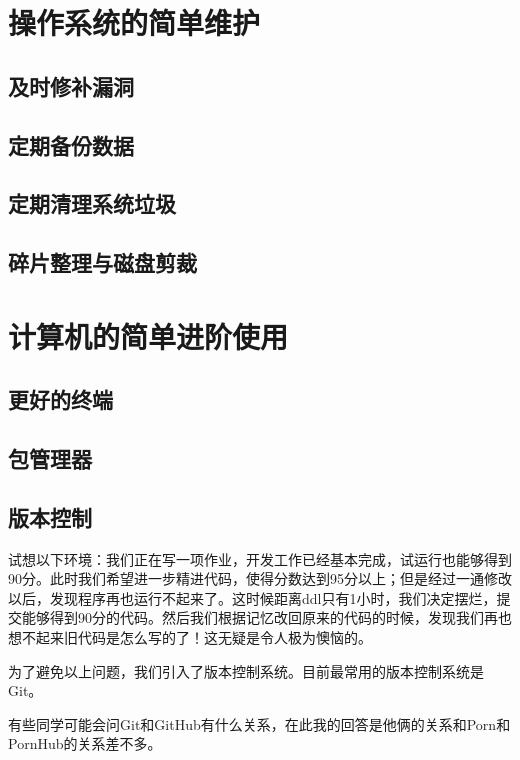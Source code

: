 \documentclass[12pt]{report}
\begin{document}
\section{操作系统的简单维护}

\subsection{及时修补漏洞}

\subsection{定期备份数据}

\subsection{定期清理系统垃圾}

\subsection{碎片整理与磁盘剪裁}

\section{计算机的简单进阶使用}

\subsection{更好的终端}

\subsection{包管理器}

\subsection{版本控制} %

试想以下环境：我们正在写一项作业，开发工作已经基本完成，试运行也能够得到90分。此时我们希望进一步精进代码，使得分数达到95分以上；但是经过一通修改以后，发现程序再也运行不起来了。这时候距离ddl只有1小时，我们决定摆烂，提交能够得到90分的代码。然后我们根据记忆改回原来的代码的时候，发现我们再也想不起来旧代码是怎么写的了！这无疑是令人极为懊恼的。

为了避免以上问题，我们引入了版本控制系统。目前最常用的版本控制系统是Git。

有些同学可能会问Git和GitHub有什么关系，在此我的回答是他俩的关系和Porn和PornHub的关系差不多。
\end{document}
